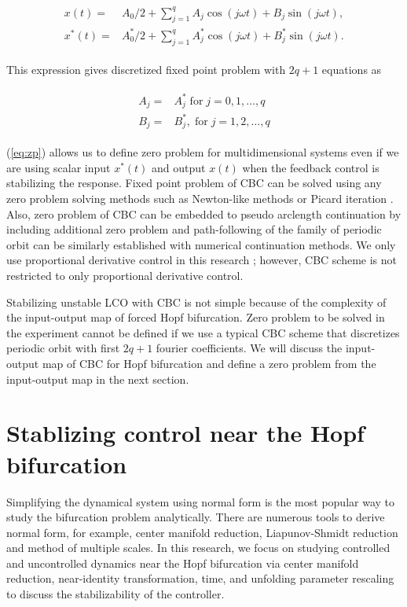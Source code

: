 \documentclass[openacc]{rsproca_new}%
\newcommand{\Eref}[1]{(\ref{#1})}
\begin{document}
\begin{align}
  \begin{split}
  x(t)=&A_0/2+  \sum_{j=1}^{q} A_j \cos (j\omega t)+B_j \sin (j\omega t),\\
  x^*(t)=&A_0^*/2+  \sum_{j=1}^{q} A^*_j \cos (j\omega t)+B^*_j \sin (j\omega t).
\end{split}
\end{align}

\noindent This expression gives discretized fixed point problem with $2q+1$ equations as

\begin{align}\label{eq:zp}
  \begin{split}
  A_j=&A^*_j \; \textrm{for} \; j=0,1,\ldots,q\\
  B_j=&B^*_j,\; \textrm{for} \; j=1,2,\ldots,q
\end{split}
\end{align}

\noindent \Eref{eq:zp} allows us to define zero problem for multidimensional systems even if we are using scalar input $x^*(t)$ and output $x(t)$ when the feedback control is stabilizing the response. Fixed point problem of CBC can be solved using any zero problem solving methods such as Newton-like methods \cite{schilder2015experimental} or Picard iteration \cite{barton2013systematic}. Also, zero problem of CBC can be embedded to pseudo arclength continuation by including additional zero problem and path-following of the family of periodic orbit can be similarly established with numerical continuation methods. We only use proportional derivative control in this research ; however, CBC scheme is not restricted to only proportional derivative control.

Stabilizing unstable LCO with CBC is not simple because of the complexity of the input-output map of forced Hopf bifurcation. Zero problem to be solved in the experiment cannot be defined if we use a typical CBC scheme that discretizes periodic orbit with first $2q+1$ fourier coefficients. We will discuss the input-output map of CBC for Hopf bifurcation and define a zero problem from the input-output map in the next section.




\section{Stablizing control near the Hopf bifurcation}\label{SNH}

Simplifying the dynamical system using normal form is the most popular way to study the bifurcation problem analytically. There are numerous tools to derive normal form, for example, center manifold reduction, Liapunov-Shmidt reduction and method of multiple scales. In this research, we focus on studying controlled and uncontrolled dynamics near the Hopf bifurcation via center manifold reduction, near-identity transformation, time, and unfolding parameter rescaling to discuss the stabilizability of the controller.
\end{document}
